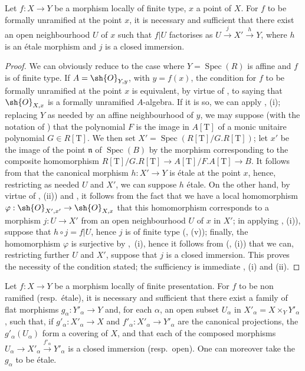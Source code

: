 \begin{corollary}[18.4.7]
\label{IV.18.4.7}
Let $f:X\to Y$ be a morphism locally of finite type, $x$ a point of $X$.
For $f$ to be formally unramified at the point $x$, it is necessary and sufficient that there exist an open neighbourhood $U$ of $x$ such that $f|U$ factorises as $U\xrightarrow{j}X'\xrightarrow{h}Y$, where $h$ is an \'etale morphism and $j$ is a closed immersion.
\end{corollary}

\begin{proof}
We can obviously reduce to the case where $Y=\operatorname{Spec}(R)$ is affine and $f$ is of finite type.
If $A=\sh{O}_{Y,y}$, with $y=f(x)$, the condition for $f$ to be formally unramified at the point $x$ is equivalent, by virtue of , to saying that $\sh{O}_{X,x}$ is a formally unramified $A$-algebra.
If it is so, we can apply , (i);
replacing $Y$ as needed by an affine neighbourhood of $y$, we may suppose (with the notation of ) that the polynomial $F$ is the image in $A[\mathrm{T}]$ of a monic unitaire polynomial $G\in R[\mathrm{T}]$.
We then set $X'=\operatorname{Spec}(R[\mathrm{T}]/G.R[\mathrm{T}])$;
let $x'$ be the image of the point $\mathfrak{n}$ of $\operatorname{Spec}(B)$ by the morphism corresponding to the composite homomorphism $R[\mathrm{T}]/G.R[\mathrm{T}]\to A[\mathrm{T}]/F.A[\mathrm{T}]\to B$.
It follows from  that the canonical morphism $h:X'\to Y$ is \'etale at the point $x$, hence, restricting as needed $U$ and $X'$, we can suppose $h$ \'etale.
On the other hand, by virtue of , (ii)) and , it follows from the fact that we have a local homomorphism $\varphi:\sh{O}_{X',x'}\to\sh{O}_{X,x}$ that this homomorphism corresponds to a morphism $j:U\to X'$ from an open neighbourhood $U$ of $x$ in $X'$;
in applying , (i)), suppose that $h\circ j=f|U$, hence $j$ is of finite type (, (v));
finally, the homomorphism $\varphi$ is surjective by ,~(i), hence it follows from (, (i)) that we can, restricting further $U$ and $X'$, suppose that $j$ is a closed immersion.
This proves the necessity of the condition stated;
the sufficiency is immediate , (i) and (ii).
\end{proof}

\begin{corollary}[18.4.8]
\label{IV.18.4.8}
Let $f:X\to Y$ be a morphism locally of finite presentation.
For $f$ to be non ramified (resp.\ \'etale), it is necessary and sufficient that there exist a family of flat morphisms $g_\alpha:Y'_\alpha\to Y$ and, for each $\alpha$, an open subset $U_\alpha$ in $X'_\alpha=X\times_Y Y'_\alpha$, such that, if $g'_\alpha:X'_\alpha\to X$ and $f'_\alpha:X'_\alpha\to Y'_\alpha$ are the canonical projections, the $g'_\alpha(U_\alpha)$ form a covering of $X$, and that each of the composed morphisms $U_\alpha\to X'_\alpha\xrightarrow{f'_\alpha}Y'_\alpha$ is a closed immersion (resp.\ open).
One can moreover take the $g_\alpha$ to be \'etale.
\end{corollary}

